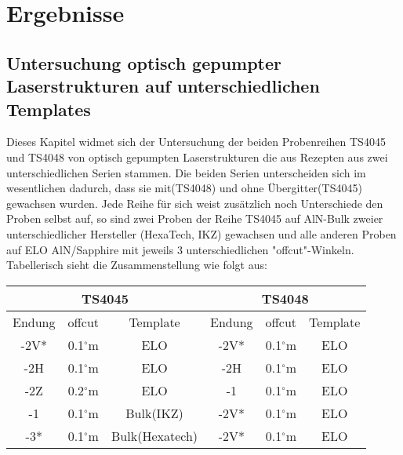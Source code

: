 \chapter{Ergebnisse}
\thispagestyle{fancy}
\section{Untersuchung optisch gepumpter Laserstrukturen auf unterschiedlichen Templates}


Dieses Kapitel widmet sich der Untersuchung der beiden Probenreihen TS4045 und TS4048 von optisch gepumpten Laserstrukturen die aus Rezepten aus zwei unterschiedlichen Serien stammen. Die beiden Serien unterscheiden sich im wesentlichen dadurch, dass sie mit(TS4048) und ohne Übergitter(TS4045) gewachsen wurden. Jede Reihe für sich weist  zusätzlich noch Unterschiede den Proben selbst auf, so sind zwei Proben der Reihe TS4045 auf AlN-Bulk zweier unterschiedlicher Hersteller (HexaTech, IKZ) gewachsen und alle  anderen Proben auf ELO AlN/Sapphire mit jeweils 3 unterschiedlichen "offcut"-Winkeln. Tabellerisch sieht die  Zusammenstellung wie folgt aus: 

\vspace{1cm}


\setlength{\arrayrulewidth}{0.5mm}
\setlength{\tabcolsep}{0.5pt}
\renewcommand{\arraystretch}{1.5}
 

\begin{tabular}{ |c|c|c|c|c|c|   }
\hline
\multicolumn{3}{|c|}{TS4045} & \multicolumn{3}{c|}{TS4048}  \\
\hline
Endung & offcut& Template & Endung & offcut& Template \\
\hline
-2V* & 0.1$^\circ$m & ELO & -2V* & 0.1$^\circ$m & ELO \\
-2H & 0.1$^\circ$m & ELO & -2H & 0.1$^\circ$m & ELO \\
-2Z & 0.2$^\circ$m & ELO & -1 & 0.1$^\circ$m & ELO \\
-1 & 0.1$^\circ$m & Bulk(IKZ) & -2V* & 0.1$^\circ$m & ELO \\
-3* & 0.1$^\circ$m & Bulk(Hexatech) & -2V* & 0.1$^\circ$m & ELO \\
\hline



\end{tabular}


